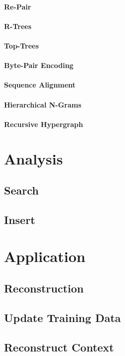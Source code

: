 \paragraph{Re-Pair}
\paragraph{R-Trees}
\paragraph{Top-Trees}
\paragraph{Byte-Pair Encoding}
\paragraph{Sequence Alignment}
\paragraph{Hierarchical N-Grams}
\paragraph{Recursive Hypergraph}

\section{Analysis}
\subsection{Search}
\subsection{Insert}

\section{Application}
\subsection{Reconstruction}
\subsection{Update Training Data}
\subsection{Reconstruct Context}
